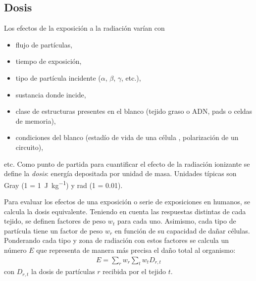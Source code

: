 \subsection{Dosis}
Los efectos de la exposición a la radiación varían con 
\begin{itemize}
    \item flujo de partículas,
    \item tiempo de exposición,
    \item tipo de partícula incidente ($\alpha$, $\beta$, $\gamma$, etc.),
    \item sustancia donde incide,
    \item clase de estructuras presentes en el blanco (tejido graso o ADN,
        pads o celdas de memoria),
    \item condiciones del blanco (estadío de vida de una célula
        \cite{podgorsak_radiation_2005}, polarización de un circuito),
\end{itemize}etc.
Como punto de partida para cuantificar el efecto de la radiación ionizante
se define la \emph{dosis}: energía depositada por unidad de masa.
Unidades típicas son Gray 
(\SI{1}{\Gray} = \SI{1}{\joule\per\kilo\gram}) 
y rad 
(\SI{1}{\rad} = \SI{0.01}{\Gray}).

Para evaluar los efectos de una exposición o serie de exposiciones en humanos,
se calcula la dosis equivalente\cite{martin_effective_2007}.
Teniendo en cuenta las respuestas distintas de cada tejido,
se definen factores de peso $w_t$ para cada uno.
Asimismo, cada tipo de partícula tiene un factor de peso $w_r$
en función de su capacidad de dañar células.
Ponderando cada tipo y zona de radiación con estos factores se calcula un
número $E$ que representa de manera más precisa el daño total al organismo:
\begin{align*}
    E = \sum_r w_r \sum_t w_t D_{r,t}
\end{align*}
con $D_{r,t}$ la dosis de partículas $r$ recibida por el tejido $t$.
